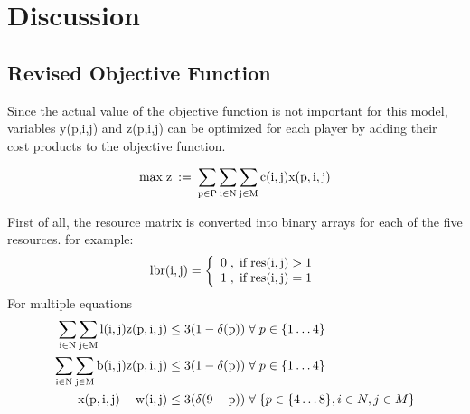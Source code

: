 \documentclass[review, 1p, number, sort&compress,table]{elsarticle}
\begin{document}
\section{Discussion}\label{sec:discussion}

\subsection{Revised Objective Function}
	 Since the actual value of the objective function is not important for this model, variables y(p,i,j) and z(p,i,j) can be optimized for each player by adding their cost products to the objective function.
	
\begin{equation} \label{eq:obj}
	  \rm max\; z\: := \: \sum_{p \in P}\sum_{i \in N}\sum_{j \in M}{c(i,j)x(p,i,j)}
	\end{equation} 
	
	First of all, the resource matrix is converted into binary arrays for each of the five resources. for example:
	\[ \rm
	 lbr(i,j) = \left\{ \begin{array}{ll} 
									\rm 0\; ,\; if\: res(i,j) > 1\\
									\rm 1\; , \; if\: res(i,j) = 1 \\
								 \end{array}\right.
	\]
	For multiple equations
	\begin{align*} \label{eq:cityW}
			\rm \sum_{i \in N}\sum_{j \in M}{l(i,j)z(p,i,j)} \leq 3(1-\delta(p)) \; &\forall \; p \in \{1 \ldots 4\} \\
			\rm \sum_{i \in N}\sum_{j \in M}{b(i,j)z(p,i,j)} \leq 3(1-\delta(p)) \; &\forall \; p \in \{1 \ldots 4\} \\
			\rm {x(p,i,j) - w(i,j)} \leq 3(\delta(9-p)) \; &\forall \; \{p \in \{4 \ldots 8\}, i \in N, j \in M \}
	\end{align*}	


	 
	      
\end{document}
